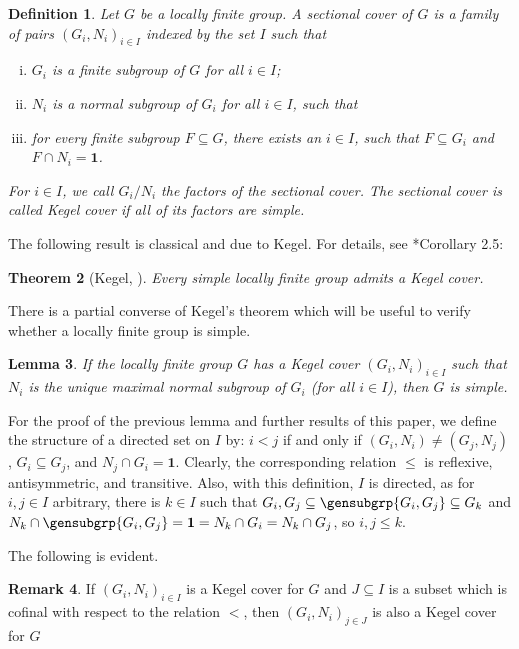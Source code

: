 \documentclass[a4paper,12pt]{amsproc}
\theoremstyle{plain}
\newtheorem{definition}{Definition}[section]
\newtheorem{theorem}[definition]{Theorem}
\newtheorem{lemma}[definition]{Lemma}
\theoremstyle{definition}
\newtheorem{remark}[definition]{Remark}
\begin{document}
\begin{definition}\label{def:sec_cov}
Let $G$ be a locally finite group. A \emph{sectional cover} of $G$ is a family of pairs $(G_i,N_i)_{i\in I}$ indexed by the set $I$ such that
\begin{enumerate}[(i)]
\item $G_i$ is a finite subgroup of $G$ for all $i\in I$;
\item $N_i$ is a normal subgroup of $G_i$ for all $i\in I$, such that
\item for every finite subgroup $F\subseteq G$, there exists an $i\in I$, such that $F\subseteq G_i$ and $F\cap N_i=\mathbf{1}$.
\end{enumerate}
For $i\in I$, we call $G_i/N_i$ the \emph{factors} of the sectional cover. The sectional cover is called \emph{Kegel cover} if all of its factors are simple.
\end{definition}
	
The following result is classical and due to Kegel. For details, see \cite{hartley1995simple}*{Corollary 2.5}:
	
\begin{theorem}[Kegel, \cite{kegel}]\label{thm:kegel}
Every simple locally finite group admits a Kegel cover. 
\end{theorem}
	
There is a partial converse of Kegel's theorem which will be useful to verify whether a locally finite group is simple.
	
\begin{lemma}\label{lem:kegel_convrse}
If the locally finite group $G$ has a Kegel cover $(G_i,N_i)_{i\in I}$ such that $N_i$ is the unique maximal normal subgroup of $G_i$ (for all $i\in I$), then $G$ is simple.
\end{lemma}

For the proof of the previous lemma and further results of this paper, we define the structure of a directed set on $I$ by: $i<j$ if and only if $(G_i,N_i)\neq(G_j,N_j)$, $G_i\subseteq G_j$, and $N_j\cap G_i=\mathbf{1}$. Clearly, the corresponding relation $\leq$ is reflexive, antisymmetric, and transitive. Also, with this definition, $I$ is directed, as for $i,j\in I$ arbitrary, there is $k\in I$ such that $G_i,G_j\subseteq\gensubgrp{G_i,G_j}\subseteq G_k$ and $N_k\cap\gensubgrp{G_i,G_j}=\mathbf{1}=N_k\cap G_i=N_k\cap G_j$, so $i,j\leq k$.

The following is evident.

\begin{remark}
If $(G_i,N_i)_{i\in I}$ is a Kegel cover for $G$ and $J \subseteq I$ 
    is a subset which is cofinal with respect to the relation $<$, 
    then $(G_i,N_i)_{j\in J}$ is also a Kegel cover for $G$
\end{remark}
 
\end{document}
